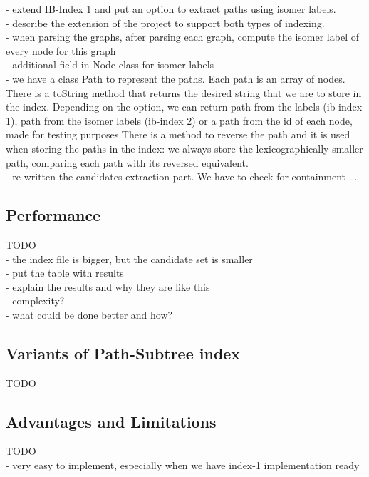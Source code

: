 \documentclass{l4proj}
\theoremstyle{definition}
\begin{document}
       - extend IB-Index 1 and put an option to extract paths using isomer labels.\\
       - describe the extension of the project to support both types of indexing.\\
       - when parsing the graphs, after parsing each graph, compute the isomer label of every node for this graph\\
       - additional field in Node class for isomer labels\\
       - we have a class Path to represent the paths. Each path is an array of nodes. There is a toString method that returns the desired string that we are to store in the index. Depending on the option, we can return path from the labels (ib-index 1), path from the isomer labels (ib-index 2) or a path from the id of each node, made for testing purposes There is a method to reverse the path and it is used when storing the paths in the index: we always store the lexicographically smaller path, comparing each path with its reversed equivalent.\\
       - re-written the candidates extraction part. We have to check for containment ... \\
\subsection{Performance}
TODO \\
       - the index file is bigger, but the candidate set is smaller\\
       - put the table with results\\
       - explain the results and why they are like this\\
	   - complexity?\\
 	   - what could be done better and how?\\
\subsection{Variants of Path-Subtree index}
TODO \\
\subsection{Advantages and Limitations}
TODO \\
 - very easy to implement, especially when we have index-1 implementation ready\\
\end{document}
